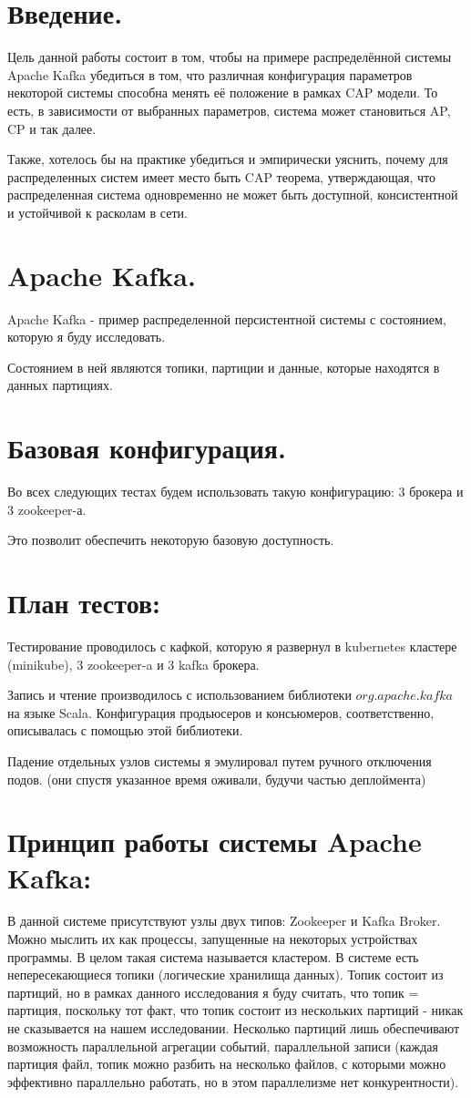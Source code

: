 \documentclass[11pt]{article}
\begin{document}
    \section{Введение.}
    Цель данной работы состоит в том, чтобы на примере распределённой системы Apache Kafka убедиться в том, что различная конфигурация параметров некоторой системы способна менять её положение в рамках CAP модели. То есть, в зависимости от выбранных параметров, система может становиться AP, CP и так далее.

    Также, хотелось бы на практике убедиться и эмпирически уяснить, почему для распределенных систем имеет место быть CAP теорема, утверждающая, что распределенная система одновременно не может быть доступной, консистентной и устойчивой к расколам в сети.
    \section{Apache Kafka.}
    Apache Kafka - пример распределенной персистентной системы с состоянием, которую я буду исследовать.

    Состоянием в ней являются топики, партиции и данные, которые находятся в данных партициях.
    \section{Базовая конфигурация.}
    Во всех следующих тестах будем использовать такую конфигурацию: 3 брокера и 3 zookeeper-а.

    Это позволит обеспечить некоторую базовую доступность.
    \section{План тестов:}
    Тестирование проводилось с кафкой, которую я развернул в kubernetes кластере (minikube), 3 zookeeper-a и 3 kafka брокера.

    Запись и чтение производилось с использованием библиотеки $org.apache.kafka$ на языке Scala. Конфигурация продьюсеров и консьюмеров, соответственно, описывалась с помощью этой библиотеки.

    Падение отдельных узлов системы я эмулировал путем ручного отключения подов. (они спустя указанное время оживали, будучи частью деплоймента)
    \section{Принцип работы системы Apache Kafka:}
    В данной системе присутствуют узлы двух типов: Zookeeper и Kafka Broker. Можно мыслить их как процессы, запущенные на некоторых устройствах программы. В целом такая система называется кластером. В системе есть непересекающиеся топики (логические хранилища данных). Топик состоит из партиций, но в рамках данного исследования я буду считать, что топик = партиция, поскольку тот факт, что топик состоит из нескольких партиций - никак не сказывается на нашем исследовании. Несколько партиций лишь обеспечивают возможность параллельной агрегации событий, параллельной записи (каждая партиция файл, топик можно разбить на несколько файлов, с которыми можно эффективно параллельно работать, но в этом параллелизме нет конкурентности).
\end{document}
